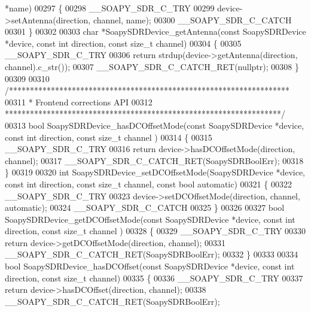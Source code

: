 \begin{DoxyCode}
       *name)
00297 \{
00298     __SOAPY_SDR_C_TRY
00299     device->setAntenna(direction, channel, name);
00300     __SOAPY_SDR_C_CATCH
00301 \}
00302 
00303 \textcolor{keywordtype}{char} *SoapySDRDevice_getAntenna(\textcolor{keyword}{const} SoapySDRDevice *device, \textcolor{keyword}{const} \textcolor{keywordtype}{int} direction, \textcolor{keyword}{const} \textcolor{keywordtype}{size\_t} channel)
00304 \{
00305     __SOAPY_SDR_C_TRY
00306     \textcolor{keywordflow}{return} strdup(device->getAntenna(direction, channel).c\_str());
00307     __SOAPY_SDR_C_CATCH_RET(\textcolor{keyword}{nullptr});
00308 \}
00309 
00310 \textcolor{comment}{/*******************************************************************}
00311 \textcolor{comment}{ * Frontend corrections API}
00312 \textcolor{comment}{ ******************************************************************/}
00313 \textcolor{keywordtype}{bool} SoapySDRDevice_hasDCOffsetMode(\textcolor{keyword}{const} SoapySDRDevice *device, \textcolor{keyword}{const} \textcolor{keywordtype}{int} direction, \textcolor{keyword}{const} \textcolor{keywordtype}{size\_t} channel
      )
00314 \{
00315     __SOAPY_SDR_C_TRY
00316     \textcolor{keywordflow}{return} device->hasDCOffsetMode(direction, channel);
00317     __SOAPY_SDR_C_CATCH_RET(SoapySDRBoolErr);
00318 \}
00319 
00320 \textcolor{keywordtype}{int} SoapySDRDevice_setDCOffsetMode(SoapySDRDevice *device, \textcolor{keyword}{const} \textcolor{keywordtype}{int} direction, \textcolor{keyword}{const} \textcolor{keywordtype}{size\_t} channel, \textcolor{keyword}{const}
       \textcolor{keywordtype}{bool} automatic)
00321 \{
00322     __SOAPY_SDR_C_TRY
00323     device->setDCOffsetMode(direction, channel, automatic);
00324     __SOAPY_SDR_C_CATCH
00325 \}
00326 
00327 \textcolor{keywordtype}{bool} SoapySDRDevice_getDCOffsetMode(\textcolor{keyword}{const} SoapySDRDevice *device, \textcolor{keyword}{const} \textcolor{keywordtype}{int} direction, \textcolor{keyword}{const} \textcolor{keywordtype}{size\_t} channel
      )
00328 \{
00329     __SOAPY_SDR_C_TRY
00330     \textcolor{keywordflow}{return} device->getDCOffsetMode(direction, channel);
00331     __SOAPY_SDR_C_CATCH_RET(SoapySDRBoolErr);
00332 \}
00333 
00334 \textcolor{keywordtype}{bool} SoapySDRDevice_hasDCOffset(\textcolor{keyword}{const} SoapySDRDevice *device, \textcolor{keyword}{const} \textcolor{keywordtype}{int} direction, \textcolor{keyword}{const} \textcolor{keywordtype}{size\_t} channel)
00335 \{
00336     __SOAPY_SDR_C_TRY
00337     \textcolor{keywordflow}{return} device->hasDCOffset(direction, channel);
00338     __SOAPY_SDR_C_CATCH_RET(SoapySDRBoolErr);

\end{DoxyCode}

